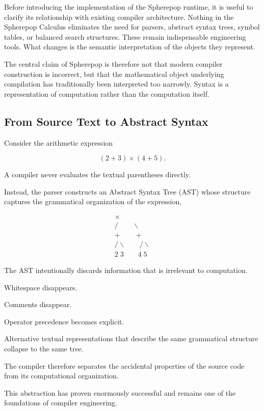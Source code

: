 \documentclass[12pt,oneside]{article}
\theoremstyle{definition}
\theoremstyle{remark}
\begin{document}
Before introducing the implementation of the Spherepop runtime, it is useful
to clarify its relationship with existing compiler architecture. Nothing in
the Spherepop Calculus eliminates the need for parsers, abstract syntax trees,
symbol tables, or balanced search structures. These remain indispensable
engineering tools. What changes is the semantic interpretation of the objects
they represent.

The central claim of Spherepop is therefore not that modern compiler
construction is incorrect, but that the mathematical object underlying
compilation has traditionally been interpreted too narrowly. Syntax is a
representation of computation rather than the computation itself.

\subsection{From Source Text to Abstract Syntax}

Consider the arithmetic expression

\[
(2+3)\times(4+5).
\]

A compiler never evaluates the textual parentheses directly.

Instead, the parser constructs an Abstract Syntax Tree (AST) whose structure
captures the grammatical organization of the expression,

\[
\begin{array}{c}
\times\\[0.3em]
/\qquad\backslash\\[0.3em]
+\qquad +\\[0.3em]
/\backslash\qquad/\backslash\\[0.3em]
2\;3\qquad4\;5
\end{array}
\]

The AST intentionally discards information that is irrelevant to computation.

Whitespace disappears.

Comments disappear.

Operator precedence becomes explicit.

Alternative textual representations that describe the same grammatical
structure collapse to the same tree.

The compiler therefore separates the accidental properties of the source code
from its computational organization.

This abstraction has proven enormously successful and remains one of the
foundations of compiler engineering.
\end{document}
